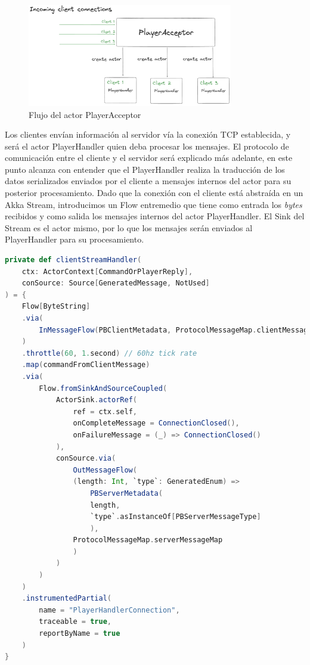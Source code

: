 \begin{figure}[htbp]
    \centering
    \includegraphics[width=0.8\textwidth]{../assets/player-acceptor.png}
    \caption{Flujo del actor PlayerAcceptor}
\end{figure}

Los clientes envían información al servidor vía la conexión TCP establecida, y será el actor PlayerHandler quien deba procesar
los mensajes. El protocolo de comunicación entre el cliente y el servidor será explicado más adelante, en este punto alcanza con entender
que el PlayerHandler realiza la traducción de los datos serializados enviados por el cliente a mensajes internos del actor para su posterior
procesamiento. Dado que la conexión con el cliente está abstraída en un Akka Stream, introducimos un Flow entremedio que tiene como entrada
los \textit{bytes} recibidos y como salida los mensajes internos del actor PlayerHandler. El Sink del Stream es el actor mismo,
por lo que los mensajes serán enviados al PlayerHandler para su procesamiento.

\begin{lstlisting}[language=Scala, caption={\textbf{Stream de conexión del cliente}}]
private def clientStreamHandler(
    ctx: ActorContext[CommandOrPlayerReply],
    conSource: Source[GeneratedMessage, NotUsed]
) = {
    Flow[ByteString]
    .via(
        InMessageFlow(PBClientMetadata, ProtocolMessageMap.clientMessageMap)
    )
    .throttle(60, 1.second) // 60hz tick rate
    .map(commandFromClientMessage)
    .via(
        Flow.fromSinkAndSourceCoupled(
            ActorSink.actorRef(
                ref = ctx.self,
                onCompleteMessage = ConnectionClosed(),
                onFailureMessage = (_) => ConnectionClosed()
            ),
            conSource.via(
                OutMessageFlow(
                (length: Int, `type`: GeneratedEnum) =>
                    PBServerMetadata(
                    length,
                    `type`.asInstanceOf[PBServerMessageType]
                    ),
                ProtocolMessageMap.serverMessageMap
                )
            )
        )
    )
    .instrumentedPartial(
        name = "PlayerHandlerConnection",
        traceable = true,
        reportByName = true
    )
}
\end{lstlisting}

